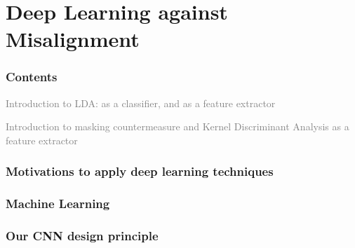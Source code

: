 \section{Deep Learning against Misalignment}
\begin{frame}
\frametitle{Contents}
\begin{itemize}
\item \textcolor{grey}{Introduction to LDA: as a classifier, and as a feature extractor
\item Introduction to masking countermeasure and Kernel Discriminant Analysis as a feature extractor}
\item {}
\end{itemize}
\end{frame}
\begin{frame}
\frametitle{Motivations to apply deep learning techniques}

\end{frame}

\begin{frame}
\frametitle{Machine Learning}

\end{frame}


\begin{frame}
\frametitle{Our CNN design principle}

\end{frame}